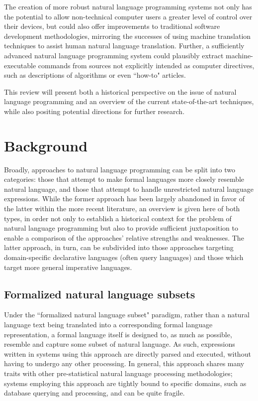 \documentclass[a4paper,11pt]{proposal}
\begin{document}
The creation of more robust natural language programming systems not only has the potential to allow non-technical computer users a greater level of control over their devices, but could also offer improvements to traditional software development methodologies, mirroring the successes of using machine translation techniques to assist human natural language translation. Further, a sufficiently advanced natural language programming system could plausibly extract machine-executable commands from sources not explicitly intended as computer directives, such as descriptions of algorithms or even ``how-to" articles.

This review will present both a historical perspective on the issue of natural language programming and an overview of the current state-of-the-art techniques, while also positing potential directions for further research.



\section{Background} \label{sec:back}
Broadly, approaches to natural language programming can be split into two categories: those that attempt to make formal languages more closely resemble natural language, and those that attempt to handle unrestricted natural language expressions. While the former approach has been largely abandoned in favor of the latter within the more recent literature, an overview is given here of both types, in order not only to establish a historical context for the problem of natural language programming but also to provide sufficient juxtaposition to enable a comparison of the approaches' relative strengths and weaknesses. The latter approach, in turn, can be subdivided into those approaches targeting domain-specific declarative languages (often query languages) and those which target more general imperative languages.

\subsection{Formalized natural language subsets}

Under the ``formalized natural language subset" paradigm, rather than a natural language text being translated into a corresponding formal language representation, a formal language itself is designed to, as much as possible, resemble and capture some subset of natural language. As such, expressions written in systems using this approach are directly parsed and executed, without having to undergo any other processing. In general, this approach shares many traits with other pre-statistical natural language processing methodologies; systems employing this approach are tightly bound to specific domains, such as database querying and processing, and can be quite fragile. 
\end{document}
